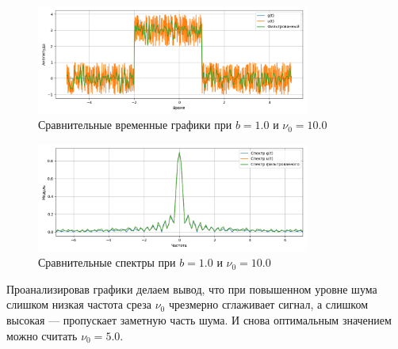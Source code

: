 \documentclass[a4paper]{article}
\begin{document}
\begin{figure}[H]
    \centering
    \includegraphics[width=0.8\textwidth]{src/lpf/time_1.0_10.0.png}
    \caption{Сравнительные временные графики при $b=1.0$ и $\nu_0=10.0$}
\end{figure}
\begin{figure}[H]
    \centering
    \includegraphics[width=0.8\textwidth]{src/lpf/spec_1.0_10.0.png}
    \caption{Сравнительные спектры при $b=1.0$ и $\nu_0=10.0$}
\end{figure}
\noindent
Проанализировав графики делаем вывод, что при повышенном уровне шума слишком низкая частота среза $\nu_0$ чрезмерно сглаживает сигнал, а слишком высокая --- пропускает заметную часть шума. И снова оптимальным значением можно считать $\nu_0 = 5.0$.
\end{document}
